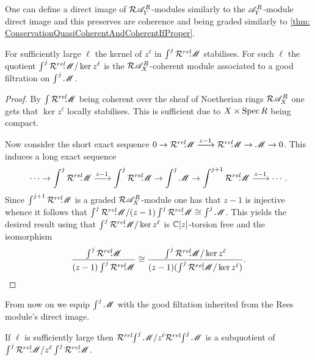 One can define a direct image of $\mathcal{R}\mathscr{A}_Y^R$-modules similarly to the $\mathscr{A}_Y^R$-module direct image and this preserves are coherence and being graded similarly to \cref{thm: ConservationQuasiCoherentAndCoherentIfProper}. 

\begin{lemma}
  For sufficiently large $\ell$ the kernel of $z^\ell$ in $\int^j \mathcal{R}^{rel}\mkern-5mu \mathscr{M}$ stabilises. For such $\ell$ the quotient $\int^j \mathcal{R}^{rel}\mkern-5mu \mathscr{M}/ \ker z^\ell$ is the $\mathcal{R} \mathscr{A}_X^R$-coherent module associated to a good filtration on $\int^j \mathscr{M}$.
\end{lemma}
\begin{proof}
  By $\int \mathcal{R}^{rel}\mkern-5mu \mathscr{M}$ being coherent over the sheaf of Noetherian rings $\mathcal{R}\mathscr{A}_X^R$ one gets that $\ker z^\ell$ locally stabilises. This is sufficient due to $X\times \operatorname{Spec} R$ being compact.

    Now consider the short exact sequence $0\to \mathcal{R}^{rel}\mkern-5mu \mathscr{M} \xrightarrow{z-1} \mathcal{R}^{rel}\mkern-5mu \mathscr{M} \to \mathscr{M} \to 0$. This induces a long exact sequence
    $$\cdots \to \int^j \mathcal{R}^{rel}\mkern-5mu \mathscr{M} \xrightarrow{z-1} \int^j \mathcal{R}^{rel}\mkern-5mu \mathscr{M} \to \int^j \mathscr{M} \to \int^{j+1} \mathcal{R}^{rel}\mkern-5mu \mathscr{M} \xrightarrow{z-1}\cdots. $$
    Since $\int^{j+1} \mathcal{R}^{rel}\mkern-5mu \mathscr{M}$ is a graded $\mathcal{R}\mathscr{A}_X^R$-module one has that $z-1$ is injective whence it follows that $\int^j \mathcal{R}^{rel}\mkern-5mu \mathscr{M} / (z-1)\int^j \mathcal{R}^{rel}\mkern-5mu \mathscr{M} \cong \int^j \mathscr{M}$. This yields the desired result using that $\int^j \mathcal{R}^{rel}\mkern-5mu \mathscr{M} / \ker z^\ell$ is $\mathbb{C}[z]$-torsion free and the isomorphism
    $$ \frac{\int^j \mathcal{R}^{rel}\mkern-5mu \mathscr{M} }{(z-1)\int^j \mathcal{R}^{rel}\mkern-5mu \mathscr{M} } \cong \frac{\int^j \mathcal{R}^{rel}\mkern-5mu \mathscr{M} /\ker z^\ell }{(z-1)(\int^j \mathcal{R}^{rel}\mkern-5mu \mathscr{M}/\ker z^\ell) }.$$
\end{proof}
From now on we equip $\int^j \mathscr{M}$ with the good filtation inherited from the Rees module's direct image.
\begin{lemma}
    If $\ell$ is sufficiently large then $\mathcal{R}^{rel}\mkern-5mu \int^j\mathscr{M} / z^\ell \mathcal{R}^{rel}\mkern-5mu \int^j \mathscr{M}$ is a subquotient of $\int^j \mathcal{R}^{rel}\mkern-5mu\mathscr{M} / z^\ell\int^j \mathcal{R}^{rel}\mkern-5mu \mathscr{M}$.
\end{lemma}
